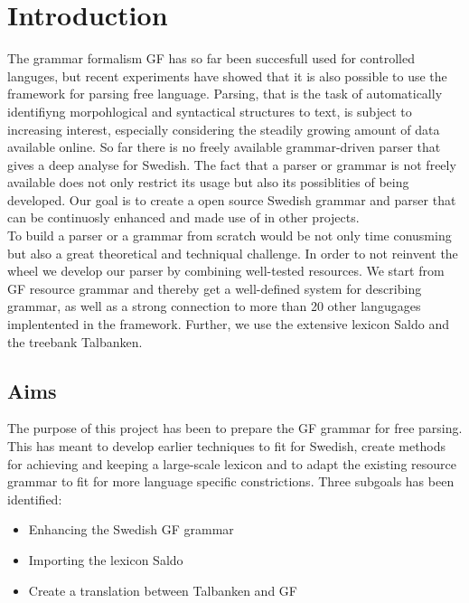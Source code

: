 \documentclass{report}
\begin{document}
\chapter{Introduction}
The grammar formalism GF has so far been succesfull used for 
controlled languges, but recent experiments have showed
that it is also possible to use the framework for parsing free language.
Parsing, that is the task of automatically identifiyng morpohlogical and
syntactical structures to text, is subject to increasing interest, especially
considering the steadily growing amount of data available online. 
So far there is no freely available grammar-driven parser that gives a deep analyse for
Swedish. The fact that %
a parser or grammar is not freely available does not only restrict its
usage but also its possiblities of being developed. Our
goal is
to create a open source Swedish grammar and parser that can be continuosly enhanced and
made use of in other projects.\\
To build a parser or a grammar from scratch would be not only time conusming but
also a great theoretical and techniqual challenge. In order to not reinvent the wheel
we develop our parser by combining well-tested resources.
We start from GF resource grammar and thereby get
a well-defined system for describing grammar, as well as a strong connection to
more than 20 other langugages implentented in the framework. Further, we use
the extensive lexicon Saldo and the treebank Talbanken.


\section{Aims}
The purpose of this project has been to prepare the GF grammar for free parsing.
This has meant to develop earlier techniques to fit for Swedish, create methods
for achieving and keeping a large-scale lexicon and to adapt the existing
resource grammar to fit for more language specific constrictions.
Three subgoals has been identified:
\begin{itemize}
\item Enhancing the Swedish GF grammar
\item Importing the lexicon Saldo
\item Create a translation between Talbanken and GF
\end{itemize}
\end{document}
